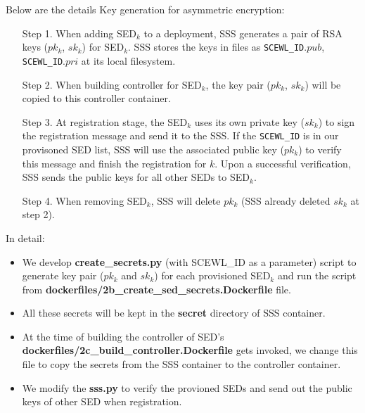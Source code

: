\documentclass[11pt,oneside,onecolumn,letterpaper]{article}
\begin{document}
Below are the details Key generation for asymmetric encryption:
\begin{itemize}
  \item[Step 1.] When adding SED$_k$ to a deployment, SSS generates a pair of RSA keys ($pk_k$, $sk_k$) for SED$_k$.
SSS stores the keys in files as \verb|SCEWL_ID|.$pub$, \verb|SCEWL_ID|.$pri$ at its local filesystem.
  \item[Step 2.] When building controller for SED$_k$, the key pair ($pk_k$, $sk_k$) will be copied to this controller container.
  \item[Step 3.] At registration stage, the SED$_k$ uses its own private key ($sk_k$) to sign the registration message and send it to the SSS.
  If the \verb|SCEWL_ID| is in our provisoned SED list, SSS will use the associated public key ($pk_k$) to verify this message and finish the registration for $k$.
Upon a successful verification, SSS sends the public keys for all other SEDs to SED$_k$.
  \item[Step 4.] When removing SED$_k$, SSS will delete $pk_k$ (SSS already deleted $sk_k$ at step 2).
\end{itemize}

In detail:
\begin{itemize}
      \item We develop \textbf{create\_secrets.py} (with SCEWL\_ID as a parameter) script to generate key pair ($pk_k$ and $sk_k$) for each provisioned SED$_k$ and run the script from  \textbf{dockerfiles/2b\_create\_sed\_secrets.Dockerfile} file.

      \item All these secrets will be kept in the \textbf{secret} directory of SSS container.
      \item At the time of building the controller of SED's \textbf{dockerfiles/2c\_build\_controller.Dockerfile}  gets invoked, we change this file to copy the secrets from the SSS container to the controller container.
      \item We modify the \textbf{sss.py} to verify the provioned SEDs and send out the public keys of other SED when registration.
\end{itemize}
\end{document}
